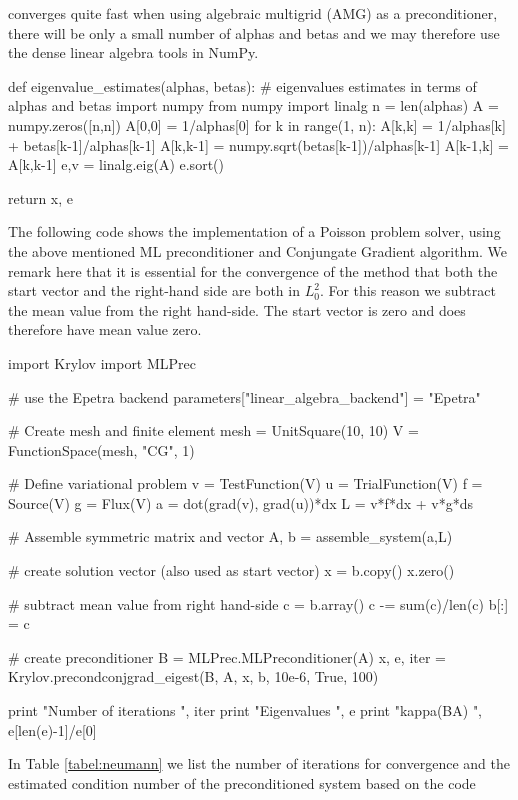 converges quite fast when using algebraic multigrid (AMG) as a preconditioner, there will be only a small
number of alphas and betas and we may therefore use the dense linear algebra tools in 
NumPy.
\begin{python}
def eigenvalue_estimates(alphas, betas):
    # eigenvalues estimates in terms of alphas and betas
    import numpy
    from numpy import linalg
    n = len(alphas)
    A = numpy.zeros([n,n])
    A[0,0] = 1/alphas[0]
    for k in range(1, n): 
        A[k,k] = 1/alphas[k] + betas[k-1]/alphas[k-1]
        A[k,k-1] = numpy.sqrt(betas[k-1])/alphas[k-1]
        A[k-1,k] = A[k,k-1]
    e,v = linalg.eig(A) 
    e.sort()

    return x, e
\end{python}
The following code shows the implementation of a Poisson problem solver, using the
above mentioned ML preconditioner and Conjungate Gradient algorithm. We remark here that it
is essential for the convergence of the method that both the start vector 
and the right-hand side are both in $L^2_0$. For this reason we subtract the 
mean value from the right hand-side.  The start vector is zero and does therefore
have mean value zero. 
\begin{python}
import Krylov 
import MLPrec 

# use the Epetra backend
parameters["linear_algebra_backend"] = "Epetra"

# Create mesh and finite element
mesh = UnitSquare(10, 10)
V = FunctionSpace(mesh, "CG", 1)

# Define variational problem
v = TestFunction(V)
u = TrialFunction(V)
f = Source(V)
g = Flux(V)
a = dot(grad(v), grad(u))*dx
L = v*f*dx + v*g*ds

# Assemble symmetric matrix and vector
A, b = assemble_system(a,L)

# create solution vector (also used as start vector) 
x = b.copy()
x.zero()

# subtract mean value from right hand-side
c = b.array()
c -= sum(c)/len(c)
b[:] = c  

# create preconditioner
B = MLPrec.MLPreconditioner(A)
x, e, iter = Krylov.precondconjgrad_eigest(B, A, x, b, 10e-6, True, 100)

print "Number of iterations ", iter
print "Eigenvalues ", e 
print "kappa(BA) ", e[len(e)-1]/e[0]
\end{python}
In Table \ref{tabel:neumann} we list the number of iterations for convergence and
the estimated condition number of the preconditioned system based on the code 
